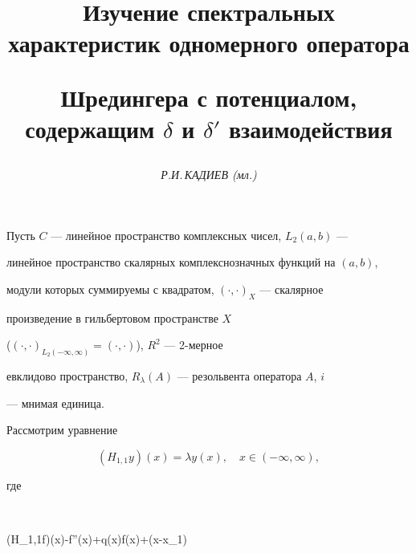 \author{\it Р.И.\,КАДИЕВ (мл.)} 




\title{Изучение спектральных характеристик одномерного оператора 


Шредингера с потенциалом,\\ содержащим $\delta$ и $\delta'$ взаимодействия} 


 


\date{} 




\pagestyle{plain} %


 




\maketitle 


\label{begin} 


 


 


Пусть $C$ --- линейное пространство комплексных чисел, $L_2(a,b)$ --- 


линейное пространство скалярных комплекснозначных функций на $(a,b)$, 


модули которых суммируемы с квадратом, $(\cdot,\cdot)_X$ --- скалярное 


произведение в гильбертовом пространстве $X$ 


($(\cdot,\cdot)_{L_2(-\infty,\infty)}=(\cdot,\cdot)$), $R^2$ --- 2-мерное 


евклидово пространство, $R_\lambda(A)$ --- резольвента оператора $A$, $i$ 


--- мнимая единица. 


 


Рассмотрим уравнение 


\begin{equation} 


(H_{1,1}y)(x)=\lambda y(x),\quad x\in(-\infty,\infty), 


\end{equation} 


где 


$$ 


(H_{1,1}f)(x)\equiv -f''(x)+q(x)f(x)+\alpha\delta(x-x_1) 


